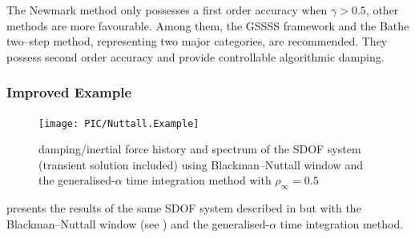 The Newmark method only possesses a first order accuracy when $\gamma>0.5$, other methods are more favourable. Among them, the GSSSS framework \citep{Zhou2003,Zhou2006} and the Bathe two--step method, representing two major categories, are recommended. They possess second order accuracy and provide controllable algorithmic damping.
\subsubsection{Improved Example}
\begin{figure}[htb!]
\centering
\texttt{[image: PIC/Nuttall.Example]}
\caption{damping/inertial force history and spectrum of the SDOF system (transient solution included) using Blackman--Nuttall window and the generalised-$\alpha$ time integration method with $\rho_\infty=0.5$}\label{fig:nuttall_example}
\end{figure}
 presents the results of the same SDOF system described in  but with the Blackman--Nuttall window (see ) and the generalised-$\alpha$ time integration method.